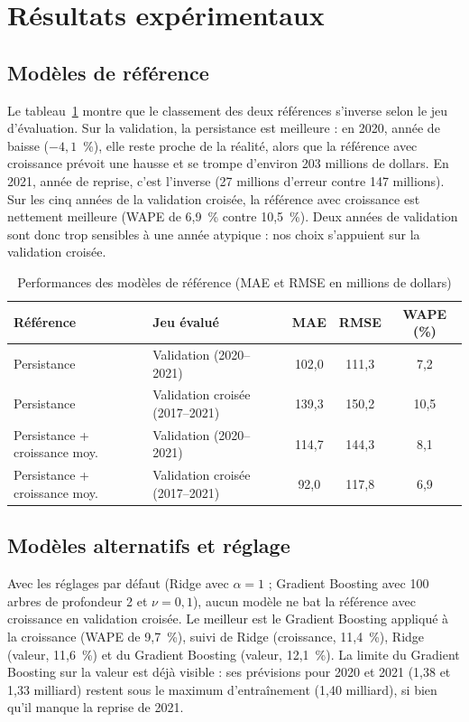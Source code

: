 \documentclass[11pt,a4paper]{article}
\begin{document}
\section{Résultats expérimentaux}\label{sec:results}

\subsection{Modèles de référence}
Le tableau~\ref{tab:references} montre que le classement des deux références s'inverse selon le jeu d'évaluation. Sur la validation, la persistance est meilleure : en 2020, année de baisse ($-4,1$~\%), elle reste proche de la réalité, alors que la référence avec croissance prévoit une hausse et se trompe d'environ 203 millions de dollars. En 2021, année de reprise, c'est l'inverse (27 millions d'erreur contre 147 millions). Sur les cinq années de la validation croisée, la référence avec croissance est nettement meilleure (WAPE de 6,9~\% contre 10,5~\%). Deux années de validation sont donc trop sensibles à une année atypique : nos choix s'appuient sur la validation croisée.

\begin{table}[H]\centering\small
\caption{Performances des modèles de référence (MAE et RMSE en millions de dollars)}\label{tab:references}
\begin{tabular}{llccc}\toprule
Référence & Jeu évalué & MAE & RMSE & WAPE (\%)\\\midrule
Persistance & Validation (2020--2021) & 102,0 & 111,3 & 7,2\\
Persistance & Validation croisée (2017--2021) & 139,3 & 150,2 & 10,5\\
Persistance + croissance moy. & Validation (2020--2021) & 114,7 & 144,3 & 8,1\\
Persistance + croissance moy. & Validation croisée (2017--2021) & 92,0 & 117,8 & 6,9\\
\bottomrule\end{tabular}
\end{table}

\subsection{Modèles alternatifs et réglage}
Avec les réglages par défaut (Ridge avec $\alpha=1$ ; Gradient Boosting avec 100 arbres de profondeur 2 et $\nu=0,1$), aucun modèle ne bat la référence avec croissance en validation croisée. Le meilleur est le Gradient Boosting appliqué à la croissance (WAPE de 9,7~\%), suivi de Ridge (croissance, 11,4~\%), Ridge (valeur, 11,6~\%) et du Gradient Boosting (valeur, 12,1~\%). La limite du Gradient Boosting sur la valeur est déjà visible : ses prévisions pour 2020 et 2021 (1,38 et 1,33 milliard) restent sous le maximum d'entraînement (1,40 milliard), si bien qu'il manque la reprise de 2021.
\end{document}

